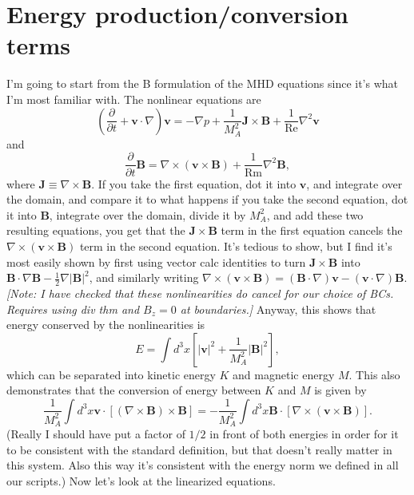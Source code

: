 \documentclass[aps,pop,preprint]{revtex4}
\newcommand{\Rm}{\mathrm{Rm}}
\renewcommand{\Re}{\mathrm{Re}}
\begin{document}
\section{Energy production/conversion terms}
I'm going to start from the B formulation of the MHD equations since it's what I'm most familiar with. 
The nonlinear equations are
\begin{equation}
	\left( \frac{\partial}{\partial t} + \mathbf{v} \cdot \nabla \right) \mathbf{v} = -\nabla p + \frac{1}{M_A^2} \mathbf{J} \times \mathbf{B} + \frac{1}{\Re} \nabla^2 \mathbf{v}
\end{equation}
	and
\begin{equation}
	\frac{\partial}{\partial t} \mathbf{B} = \nabla \times (\mathbf{v} \times \mathbf{B}) + \frac{1}{\Rm} \nabla^2 \mathbf{B},
\end{equation}
where $\mathbf{J} \equiv \nabla \times \mathbf{B}$. 
If you take the first equation, dot it into $\mathbf{v}$, and integrate over the domain, and compare it to what happens if you take the second equation, dot it into $\mathbf{B}$, integrate over the domain, divide it by $M_A^2$, and add these two resulting equations, you get that the $\mathbf{J} \times \mathbf{B}$ term in the first equation cancels the $\nabla \times (\mathbf{v} \times \mathbf{B})$ term in the second equation. 
It's tedious to show, but I find it's most easily shown by first using vector calc identities to turn $\mathbf{J} \times \mathbf{B}$ into $\mathbf{B} \cdot \nabla \mathbf{B} - \frac{1}{2} \nabla |\mathbf{B}|^2$, and similarly writing $\nabla \times ( \mathbf{v} \times \mathbf{B} ) = (\mathbf{B} \cdot \nabla) \mathbf{v} - (\mathbf{v} \cdot \nabla) \mathbf{B}$. \textit{[Note: I have checked that these nonlinearities do cancel for our choice of BCs. Requires using div thm and $B_z = 0$ at boundaries.]}
Anyway, this shows that energy conserved by the nonlinearities is
\begin{equation}
    E = \int d^3x \left[ |\mathbf{v}|^2 + \frac{1}{M_A^2} |\mathbf{B}|^2 \right],
\end{equation}
which can be separated into kinetic energy $K$ and magnetic energy $M$. 
This also demonstrates that the conversion of energy between $K$ and $M$ is given by
\begin{equation}
    \frac{1}{M_A^2} \int d^3x \mathbf{v} \cdot [ (\nabla \times \mathbf{B}) \times \mathbf{B} ] = - \frac{1}{M_A^2} \int d^3x \mathbf{B} \cdot [ \nabla \times (\mathbf{v} \times \mathbf{B}) ].
\end{equation}
(Really I should have put a factor of $1/2$ in front of both energies in order for it to be consistent with the standard definition, but that doesn't really matter in this system. 
Also this way it's consistent with the energy norm we defined in all our scripts.)
Now let's look at the linearized equations.
\end{document}
